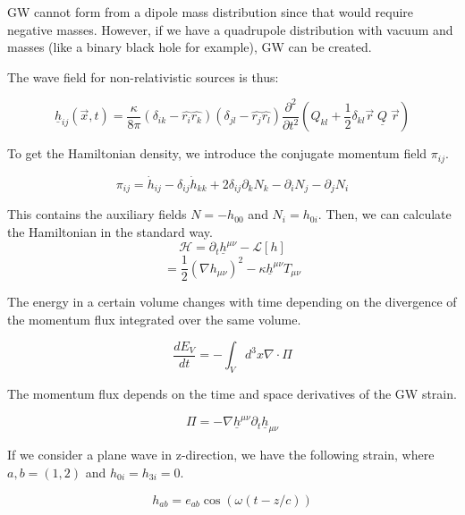 GW cannot form from a dipole mass distribution since that would require negative masses. However, if we have a quadrupole distribution with vacuum and masses (like a binary black hole for example), GW can be created.

The wave field for non-relativistic sources is thus:

\begin{equation}
    \underline{h}_{ij}(\vec{x}, t)=\frac{\kappa}{8\pi}(\delta_{ik}-\hat{r_i}\hat{r_k})(\delta_{jl}-\hat{r_j}\hat{r_l})\frac{\partial^2}{\partial t^2}\left(Q_{kl}+\frac{1}{2}\delta_{kl}\vec{r}\; \underline{Q} \; \vec{r}\right)
\end{equation}

To get the Hamiltonian density, we introduce the conjugate momentum field $\pi_{ij}$.

\begin{equation}
    \pi_{ij}=\dot{h}_{ij}-\delta_{ij}\dot{h}_{kk}+2\delta_{ij}\partial_k
N_k-\partial_i N_j-\partial_j N_i 
\end{equation}

This contains the auxiliary fields $N=-h_{00}$ and $N_i=h_{0i}$.
Then, we can calculate the Hamiltonian in the standard way.
\begin{equation}
    \mathcal{H}=\partial_t \underline{h}^{\mu\nu}-\mathcal{L}[h]
\end{equation}
\begin{equation}
    =\frac{1}{2}(\nabla h_{\mu\nu})^2-\kappa \underline{h}^{\mu\nu}T_{\mu\nu}
\end{equation}

The energy in a certain volume changes with time depending on the divergence of the momentum flux integrated over the same volume.

\begin{equation}
    \frac{dE_V}{dt}=-\int_V d^3x \nabla\cdot \Pi
\end{equation}

The momentum flux depends on the time and space derivatives of the GW strain.

\begin{equation}
    \Pi=-\nabla \underline{h}^{\mu\nu}\partial_t \underline{h}_{\mu\nu}
\end{equation}

If we consider a plane wave in z-direction, we have the following strain, where $a,b =(1, 2)$ and $h_{0i}=h_{3i}=0$.

\begin{equation}
    h_{ab} =e_{ab}\cos(\omega(t-z/c))
\end{equation}

